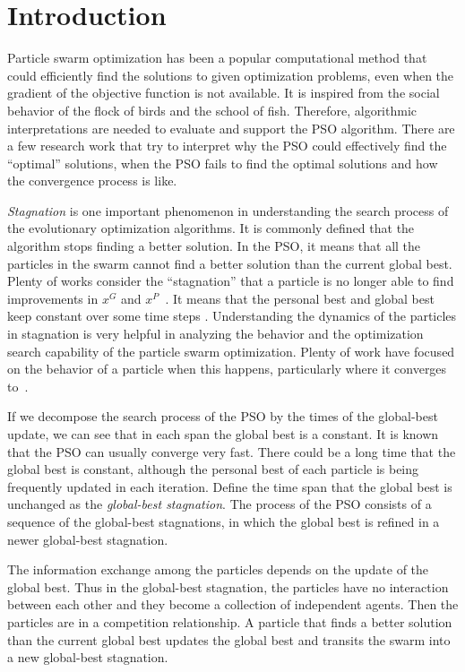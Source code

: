 \section{Introduction}
\label{sec:introduction}

Particle swarm optimization has been a popular computational method that could efficiently find the solutions to given optimization problems, even when the gradient of the objective function is not available.
It is inspired from the social behavior of the flock of birds and the school of fish.
Therefore, algorithmic interpretations are needed to evaluate and support the PSO algorithm. 
There are a few research work that try to interpret why the PSO could effectively find the ``optimal'' solutions, when the PSO fails to find the optimal solutions and how the convergence process is like.

\emph{Stagnation} is one important phenomenon in understanding the search process of the evolutionary optimization algorithms.
It is commonly defined that the algorithm stops finding a better solution.
In the PSO, it means that all the particles in the swarm cannot find a better solution than the current global best.
Plenty of works consider the ``stagnation'' that a particle is no longer able to find improvements in $ x^{G} $ and $ x^{P} $~\cite{Clerc06stagnationanalysis}.
It means that the personal best and global best keep constant over some time steps \cite{4223160}.
Understanding the dynamics of the particles in stagnation is very helpful in analyzing the behavior and the optimization search capability of the particle swarm optimization.
Plenty of work have focused on the behavior of a particle when this happens, particularly where it converges to~\cite{Schmitt:2013:PSO:2463372.2463563,Poli:2008:DSS:1384929.1384944}.

If we decompose the search process of the PSO by the times of the global-best update, we can see that in each span the global best is a constant.
It is known that the PSO can usually converge very fast.
There could be a long time that the global best is constant, although the personal best of each particle is being frequently updated in each iteration.
Define the time span that the global best is unchanged as the \emph{global-best stagnation}.
The process of the PSO consists of a sequence of the global-best stagnations, in which the global best is refined in a newer global-best stagnation.

The information exchange among the particles depends on the update of the global best.
Thus in the global-best stagnation, the particles have no interaction between each other and they become a collection of independent agents.
Then the particles are in a competition relationship.
A particle that finds a better solution than the current global best updates the global best and transits the swarm into a new global-best stagnation.

